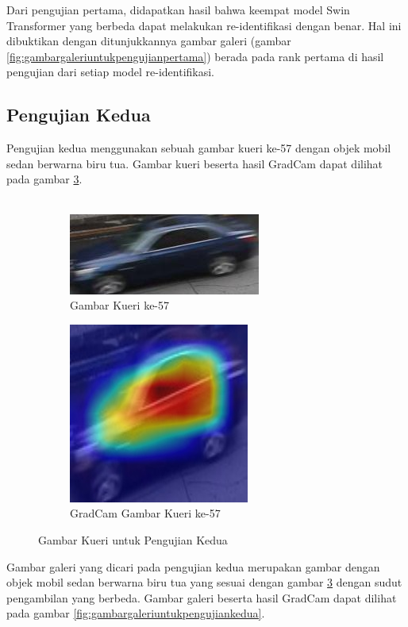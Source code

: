 Dari pengujian pertama, didapatkan hasil bahwa keempat model Swin Transformer yang berbeda dapat melakukan re-identifikasi 
dengan benar. Hal ini dibuktikan dengan ditunjukkannya gambar galeri (gambar \ref{fig:gambargaleriuntukpengujianpertama})
berada pada rank pertama di hasil pengujian dari setiap model re-identifikasi.

\subsection{Pengujian Kedua}

Pengujian kedua menggunakan sebuah gambar kueri ke-57 dengan objek mobil sedan berwarna biru tua. Gambar kueri 
beserta hasil GradCam dapat dilihat pada gambar \ref{fig:gambarkueriuntukpengujiankedua}.\\
\\

\begin{figure}[h!]
  \centering
  \begin{subfigure}{.5\textwidth}
    \centering
    \includegraphics[width=.4\linewidth]{gambar/Que57_1112.jpg}
    \caption{Gambar Kueri ke-57}
    \label{gambarkuerinomorlimatujuh}
  \end{subfigure}%
  \begin{subfigure}{.5\textwidth}
    \centering
    \includegraphics[width=.4\linewidth]{gambar/GradCamQue57_1112.jpg}
    \caption{GradCam Gambar Kueri ke-57}
    \label{gradcamgambarkuerinomorlimatujuh}
  \end{subfigure}
  \caption{Gambar Kueri untuk Pengujian Kedua}
  \label{fig:gambarkueriuntukpengujiankedua}
\end{figure}

Gambar galeri yang dicari pada pengujian kedua merupakan gambar dengan objek \linebreak mobil sedan berwarna biru tua 
yang sesuai dengan gambar \ref{fig:gambarkueriuntukpengujiankedua} dengan sudut pengambilan yang berbeda. Gambar galeri 
beserta hasil GradCam dapat dilihat pada gambar \ref{fig:gambargaleriuntukpengujiankedua}.

